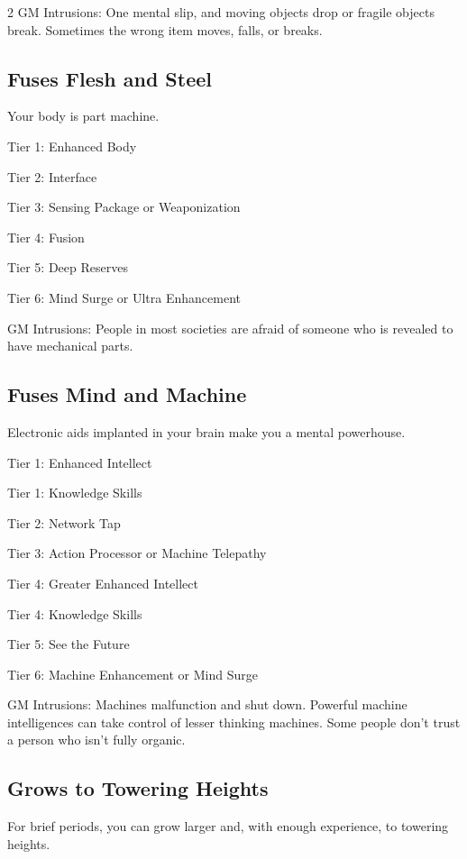 \begin{multicols}{2}
GM Intrusions: One mental slip, and moving objects drop or fragile objects break. Sometimes the wrong item moves, falls, or breaks.

\subsection{Fuses Flesh and Steel}

Your body is part machine.

Tier 1: Enhanced Body

Tier 2: Interface

Tier 3: Sensing Package or Weaponization

Tier 4: Fusion

Tier 5: Deep Reserves

Tier 6: Mind Surge or Ultra Enhancement

GM Intrusions: People in most societies are afraid of someone who is revealed to have mechanical parts.

\subsection{Fuses Mind and Machine}

Electronic aids implanted in your brain make you a mental powerhouse.

Tier 1: Enhanced Intellect

Tier 1: Knowledge Skills

Tier 2: Network Tap

Tier 3: Action Processor or Machine Telepathy

Tier 4: Greater Enhanced Intellect

Tier 4: Knowledge Skills

Tier 5: See the Future

Tier 6: Machine Enhancement or Mind Surge

GM Intrusions: Machines malfunction and shut down. Powerful machine intelligences can take control of lesser thinking machines. Some people don’t trust a person who isn’t fully organic.

\subsection{Grows to Towering Heights}

For brief periods, you can grow larger and, with enough experience, to towering heights.


\end{multicols}
